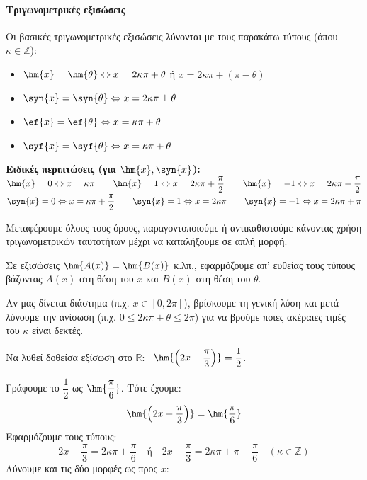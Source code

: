 \paragraph{Τριγωνομετρικές εξισώσεις}
Οι βασικές τριγωνομετρικές εξισώσεις λύνονται με τους παρακάτω τύπους (όπου $\kappa \in \mathbb{Z}$):
\begin{itemize}
    \item $\hm{x} = \hm{\theta} \Leftrightarrow x = 2\kappa\pi + \theta$ ή $x = 2\kappa\pi + (\pi - \theta)$
    \item $\syn{x} = \syn{\theta} \Leftrightarrow x = 2\kappa\pi \pm \theta$
    \item $\ef{x} = \ef{\theta} \Leftrightarrow x = \kappa\pi + \theta$
    \item $\syf{x} = \syf{\theta} \Leftrightarrow x = \kappa\pi + \theta$
\end{itemize}
\textbf{Ειδικές περιπτώσεις (για $\hm{x}, \syn{x}$):} \\
$\hm{x} = 0 \Leftrightarrow x = \kappa\pi \qquad \hm{x} = 1 \Leftrightarrow x = 2\kappa\pi + \dfrac{\pi}{2} \qquad \hm{x} = -1 \Leftrightarrow x = 2\kappa\pi - \dfrac{\pi}{2}$ \\
$\syn{x} = 0 \Leftrightarrow x = \kappa\pi + \dfrac{\pi}{2} \qquad \syn{x} = 1 \Leftrightarrow x = 2\kappa\pi \qquad \syn{x} = -1 \Leftrightarrow x = 2\kappa\pi + \pi$

\bhmata
\begin{bhma}
    \item Μεταφέρουμε όλους τους όρους, παραγοντοποιούμε ή αντικαθιστούμε κάνοντας χρήση τριγωνομετρικών ταυτοτήτων μέχρι να καταλήξουμε σε απλή μορφή.
    \item Σε εξισώσεις $\hm{A(x)} = \hm{B(x)}$ κ.λπ., εφαρμόζουμε απ’ ευθείας τους τύπους βάζοντας $A(x)$ στη θέση του $x$ και $B(x)$ στη θέση του $\theta$.
    \item Αν μας δίνεται διάστημα (π.χ. $x \in [0, 2\pi]$), βρίσκουμε τη γενική λύση και μετά λύνουμε την ανίσωση (π.χ. $0 \leq 2\kappa\pi + \theta \leq 2\pi$) για να βρούμε ποιες ακέραιες τιμές του $\kappa$ είναι δεκτές.
\end{bhma}


Να λυθεί δοθείσα εξίσωση στο $\mathbb{R}$: \ $\hm{\left(2x - \dfrac{\pi}{3}\right)} = \dfrac{1}{2}$.

\lysh
Γράφουμε το $\dfrac{1}{2}$ ως $\hm{\dfrac{\pi}{6}}$. Τότε έχουμε:
\[ \hm{\left(2x - \dfrac{\pi}{3}\right)} = \hm{\dfrac{\pi}{6}} \]
Εφαρμόζουμε τους τύπους:
\[ 2x - \dfrac{\pi}{3} = 2\kappa\pi + \dfrac{\pi}{6} \quad \text{ή} \quad 2x - \dfrac{\pi}{3} = 2\kappa\pi + \pi - \dfrac{\pi}{6} \quad (\kappa \in \mathbb{Z}) \]
Λύνουμε και τις δύο μορφές ως προς $x$:

